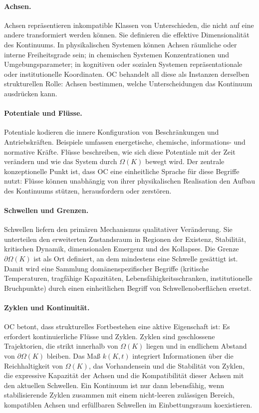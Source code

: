\paragraph{Achsen.}
Achsen repräsentieren inkompatible Klassen von Unterschieden, die nicht auf
eine andere transformiert werden können.
Sie definieren die effektive Dimensionalität des Kontinuums.
In physikalischen Systemen können Achsen räumliche oder interne Freiheitsgrade
sein; in chemischen Systemen Konzentrationen und Umgebungsparameter; in
kognitiven oder sozialen Systemen repräsentationale oder institutionelle
Koordinaten.
OC behandelt all diese als Instanzen derselben strukturellen Rolle: Achsen
bestimmen, welche Unterscheidungen das Kontinuum ausdrücken kann.

\paragraph{Potentiale und Flüsse.}
Potentiale kodieren die innere Konfiguration von Beschränkungen und
Antriebskräften. Beispiele umfassen energetische, chemische, informations-
und normative Kräfte.
Flüsse beschreiben, wie sich diese Potentiale mit der Zeit verändern und wie das
System durch \(\Omega(K)\) bewegt wird.
Der zentrale konzeptionelle Punkt ist, dass OC eine einheitliche Sprache für
diese Begriffe nutzt: Flüsse können unabhängig von ihrer physikalischen
Realisation den Aufbau des Kontinuums stützen, herausfordern oder zerstören.

\paragraph{Schwellen und Grenzen.}
Schwellen liefern den primären Mechanismus qualitativer Veränderung.
Sie unterteilen den erweiterten Zustandsraum in Regionen der Existenz,
Stabilität, kritischen Dynamik, dimensionalen Emergenz und des Kollapses.
Die Grenze \(\partial\Omega(K)\) ist als Ort definiert, an dem mindestens eine
Schwelle gesättigt ist.
Damit wird eine Sammlung domänenspezifischer Begriffe (kritische Temperaturen,
tragfähige Kapazitäten, Lebensfähigkeitsschranken, institutionelle Bruchpunkte)
durch einen einheitlichen Begriff von Schwellenoberflächen ersetzt.

\paragraph{Zyklen und Kontinuität.}
OC betont, dass strukturelles Fortbestehen eine aktive Eigenschaft ist: Es erfordert
kontinuierliche Flüsse und Zyklen.
Zyklen sind geschlossene Trajektorien, die strikt innerhalb von \(\Omega(K)\) liegen
und in endlichem Abstand von \(\partial\Omega(K)\) bleiben.
Das Maß \(k(K,t)\) integriert Informationen über die Reichhaltigkeit von
\(\Omega(K)\), das Vorhandensein und die Stabilität von Zyklen, die
expressive Kapazität der Achsen und die Kompatibilität dieser Achsen mit den
aktuellen Schwellen.
Ein Kontinuum ist nur dann lebensfähig, wenn stabilisierende Zyklen zusammen mit
einem nicht-leeren zulässigen Bereich, kompatiblen Achsen und erfüllbaren
Schwellen im Einbettungsraum koexistieren.

